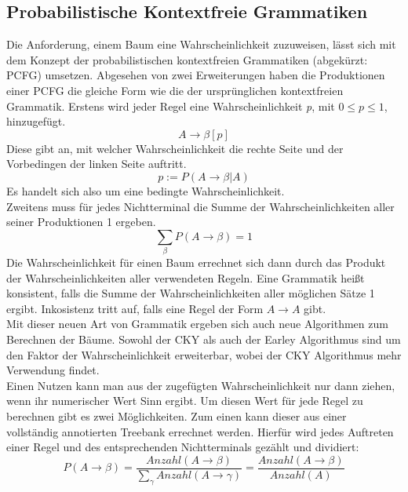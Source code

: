 \subsection{Probabilistische Kontextfreie Grammatiken}
\label{sec:nlp:stat-parsen:pcfg}

Die Anforderung, einem Baum eine Wahrscheinlichkeit zuzuweisen, lässt sich mit dem Konzept der probabilistischen kontextfreien Grammatiken (abgekürzt: PCFG) umsetzen. Abgesehen von zwei Erweiterungen haben die Produktionen einer PCFG die gleiche Form wie die der ursprünglichen kontextfreien Grammatik. Erstens wird jeder Regel eine Wahrscheinlichkeit \textit{p}, mit \( 0 \leq p \leq 1 \), hinzugefügt.
\begin{equation}
A \to \beta  [p]
\end{equation}
Diese gibt an, mit welcher Wahrscheinlichkeit die rechte Seite und der Vorbedingen der linken Seite auftritt.
\begin{equation}
p := P(A \to \beta | A)
\end{equation}
Es handelt sich also um eine bedingte Wahrscheinlichkeit.\\ 
Zweitens muss für jedes Nichtterminal die Summe der Wahrscheinlichkeiten aller seiner Produktionen 1 ergeben.
\begin{equation}
\sum_{\beta} P(A \to \beta) = 1
\end{equation}
Die Wahrscheinlichkeit für einen Baum errechnet sich dann durch das Produkt der Wahrscheinlichkeiten aller verwendeten Regeln. Eine Grammatik heißt konsistent, falls die Summe der Wahrscheinlichkeiten aller möglichen Sätze 1 ergibt. Inkosistenz tritt auf, falls eine Regel der Form \( A \to A \) gibt.\\
Mit dieser neuen Art von Grammatik ergeben sich auch neue Algorithmen zum Berechnen der Bäume. Sowohl der CKY als auch der Earley Algorithmus sind um den Faktor der Wahrscheinlichkeit erweiterbar, wobei der CKY Algorithmus mehr Verwendung findet.\\ %
Einen Nutzen kann man aus der zugefügten Wahrscheinlichkeit nur dann ziehen, wenn ihr numerischer Wert Sinn ergibt. Um diesen Wert für jede Regel zu berechnen gibt es zwei Möglichkeiten. Zum einen kann dieser aus einer vollständig annotierten Treebank errechnet werden. Hierfür wird jedes Auftreten einer Regel und des entsprechenden Nichtterminals gezählt und dividiert: 
\begin{equation}
P(A \to \beta) = \frac{Anzahl(A \to \beta)}{ \sum_{\gamma} Anzahl(A \to \gamma)} = \frac{Anzahl(A \to \beta)}{Anzahl(A)}
\end{equation}
